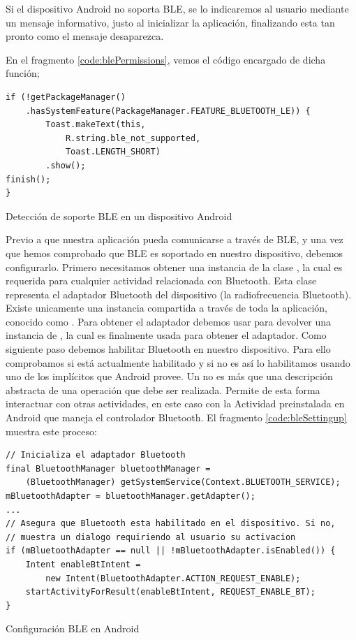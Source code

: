     Si el dispositivo Android no soporta BLE, se lo indicaremos al usuario mediante un mensaje informativo, justo al inicializar la aplicación, finalizando esta tan pronto como el mensaje desaparezca.
    
    En el fragmento \ref{code:blePermissions}, vemos el código encargado de dicha función;
    
\begin{listing}[h] 
\begin{verbatim}
if (!getPackageManager()
    .hasSystemFeature(PackageManager.FEATURE_BLUETOOTH_LE)) {
        Toast.makeText(this,
            R.string.ble_not_supported,
            Toast.LENGTH_SHORT)
        .show();
finish();
}
\end{verbatim}
\caption{Detección de soporte BLE en un dispositivo Android}
\label{code:blePermissions}
\end{listing}

Previo a que nuestra aplicación pueda comunicarse a través de BLE, y una vez que hemos comprobado que BLE es soportado en nuestro dispositivo, debemos configurarlo.
Primero necesitamos obtener una instancia de la clase , la cual es requerida para cualquier actividad relacionada con Bluetooth. Esta clase representa el adaptador Bluetooth del dispositivo (la radiofrecuencia Bluetooth). Existe unicamente una instancia compartida a través de toda la aplicación, conocido como . Para obtener el adaptador debemos usar  para devolver una instancia de , la cual es finalmente usada para obtener el adaptador.
Como siguiente paso debemos habilitar Bluetooth en nuestro dispositivo. Para ello comprobamos si está actualmente habilitado y si no es así lo habilitamos usando uno de los  implícitos que Android provee. Un  no es más que una descripción abstracta de una operación que debe ser realizada. Permite de esta forma interactuar con otras actividades, en este caso con la Actividad preinstalada en Android que maneja el controlador Bluetooth. El fragmento \ref{code:bleSettingup} muestra este proceso:

\begin{listing}[h] 
\begin{verbatim}
// Inicializa el adaptador Bluetooth
final BluetoothManager bluetoothManager =
    (BluetoothManager) getSystemService(Context.BLUETOOTH_SERVICE);
mBluetoothAdapter = bluetoothManager.getAdapter();
...
// Asegura que Bluetooth esta habilitado en el dispositivo. Si no,
// muestra un dialogo requiriendo al usuario su activacion
if (mBluetoothAdapter == null || !mBluetoothAdapter.isEnabled()) {
    Intent enableBtIntent = 
        new Intent(BluetoothAdapter.ACTION_REQUEST_ENABLE);
    startActivityForResult(enableBtIntent, REQUEST_ENABLE_BT);
}
\end{verbatim}
\caption{Configuración BLE en Android}
\label{code:bleSettingup}
\end{listing}

